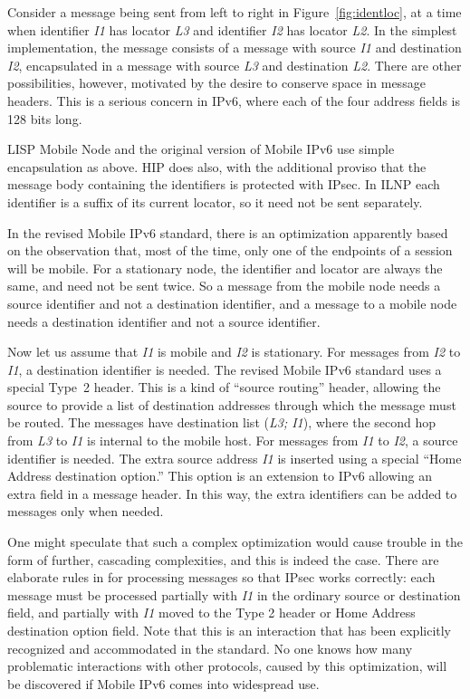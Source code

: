 Consider a message being sent from left to right in 
Figure~\ref{fig:identloc}, at a time when identifier
{\it I1} has locator {\it L3} and identifier {\it I2} has
locator {\it L2}.
In the simplest implementation, the message consists of a message
with source {\it I1} and destination {\it I2}, encapsulated
in a message with 
source {\it L3} and destination {\it L2}.
There are other possibilities, however, motivated by the desire
to conserve space in message headers.
This is a serious concern in IPv6, where each of the four address
fields is 128 bits long.

LISP Mobile Node and the original version of Mobile IPv6 use simple
encapsulation as above.
HIP does also, with the additional proviso that the message body
containing the identifiers is protected with IPsec.
In ILNP each identifier is a suffix of its current locator, so it
need not be sent separately.

In the revised Mobile IPv6 standard, there is an optimization 
apparently based on the observation that, most of the time, only
one of the endpoints of a session will be mobile.
For a stationary node, the identifier and locator are always the
same, and need not be sent twice.
So a message from the mobile node needs a source identifier and
not a destination identifier, and a message to a mobile node
needs a destination identifier and not a source identifier.

Now let us assume that {\it I1} is mobile and {\it I2} is stationary.
For messages from {\it I2} to {\it I1}, a destination identifier is 
needed.
The revised Mobile IPv6 standard uses
a special Type~2 header.
This is a kind of ``source routing'' header, allowing the source to
provide a list of destination
addresses through which the message must be routed.
The messages have destination list ({\it L3; I1}), where the second
hop from {\it L3} to {\it I1} is internal to the mobile host.
For messages from {\it I1} to {\it I2}, a source identifier is needed.
The extra source address {\it I1} is inserted using a special
``Home Address destination option.''
This option is an extension to IPv6 allowing an extra field in a
message header.
In this way, the extra identifiers can be added to messages only when
needed.

One might speculate that such a complex optimization would cause
trouble in the form of further, cascading complexities,
and this is indeed the case.
There are elaborate rules in \cite{mipv6new} for processing
messages so that IPsec works correctly:
each message must be processed partially with {\it I1} in the ordinary
source or destination field, and partially with {\it I1} moved to the
Type 2 header or Home Address destination option field.
Note that this is an interaction that has been explicitly recognized
and accommodated in the standard.
No one knows how many problematic interactions with other protocols,
caused by this optimization,
will be discovered if Mobile IPv6 comes into widespread use.

